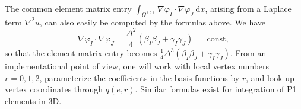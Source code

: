 \documentclass[../main.tex]{subfiles}
\begin{document}
	The common element matrix entry $\int_{\Omega^{(e)}} \nabla \varphi_{I} \cdot \nabla \varphi_{J} \mathrm{~d} x$, arising from a Laplace term $\nabla^{2} u$, can also easily be computed by the formulas above. We have
	$$
	\nabla \varphi_{I} \cdot \nabla \varphi_{J}=\frac{\Delta^{2}}{4}\left(\beta_{I} \beta_{J}+\gamma_{I} \gamma_{J}\right)=\text { const, }
	$$
	so that the element matrix entry becomes $\frac{1}{4} \Delta^{3}\left(\beta_{I} \beta_{J}+\gamma_{I} \gamma_{J}\right)$.\smallbreak
	From an implementational point of view, one will work with local vertex numbers $r=0,1,2$, parameterize the coefficients in the basis functions by $r$, and look up vertex coordinates through $q(e, r)$.\smallbreak
	Similar formulas exist for integration of P1 elements in 3D.


	
\clearpage
\end{document}
